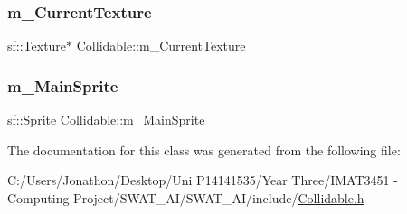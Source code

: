 \subsubsection{\texorpdfstring{m\+\_\+\+Current\+Texture}{m\_CurrentTexture}}
{\footnotesize\ttfamily sf\+::\+Texture$\ast$ Collidable\+::m\+\_\+\+Current\+Texture\hspace{0.3cm}{\ttfamily [protected]}}

\mbox{\label{class_collidable_a97a8109150e5554b0be46626358e4f3e}} 
\subsubsection{\texorpdfstring{m\+\_\+\+Main\+Sprite}{m\_MainSprite}}
{\footnotesize\ttfamily sf\+::\+Sprite Collidable\+::m\+\_\+\+Main\+Sprite\hspace{0.3cm}{\ttfamily [protected]}}



The documentation for this class was generated from the following file\+:\begin{DoxyCompactItemize}
\item 
C\+:/\+Users/\+Jonathon/\+Desktop/\+Uni P14141535/\+Year Three/\+I\+M\+A\+T3451 -\/ Computing Project/\+S\+W\+A\+T\+\_\+\+A\+I/\+S\+W\+A\+T\+\_\+\+A\+I/include/\hyperlink{_collidable_8h}{Collidable.\+h}\end{DoxyCompactItemize}
